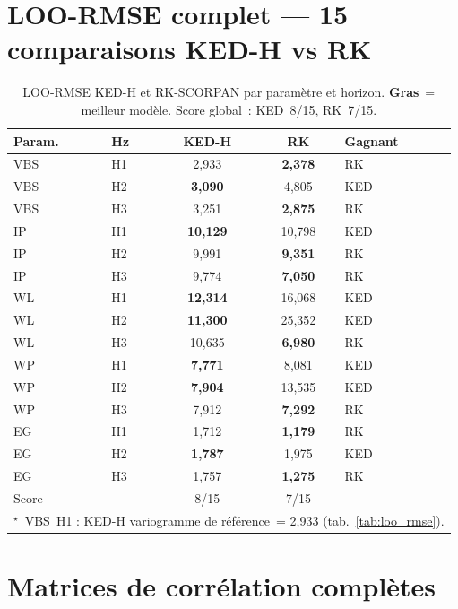 \documentclass[10pt,a4paper,twocolumn]{article}
\begin{document}
	\section{LOO-RMSE complet --- 15 comparaisons KED-H vs RK}
	\label{app:loo_complet}
	
	\begin{table}[H]
		\centering\small
		\caption{LOO-RMSE KED-H et RK-SCORPAN par paramètre et horizon.
			\textbf{Gras}~= meilleur modèle.
			Score global~: KED~8/15, RK~7/15.}
		\label{tab:loo_complet}
		\setlength{\tabcolsep}{4pt}
		\begin{tabular}{llccl}
			\toprule
			Param. & Hz & KED-H & RK & Gagnant \\
			\midrule
			VBS & H1 & 2,933          & \textbf{2,378} & RK  \\
			VBS & H2 & \textbf{3,090} & 4,805          & KED \\
			VBS & H3 & 3,251          & \textbf{2,875} & RK  \\
			IP  & H1 & \textbf{10,129}& 10,798         & KED \\
			IP  & H2 & 9,991          & \textbf{9,351} & RK  \\
			IP  & H3 & 9,774          & \textbf{7,050} & RK  \\
			WL  & H1 & \textbf{12,314}& 16,068         & KED \\
			WL  & H2 & \textbf{11,300}& 25,352         & KED \\
			WL  & H3 & 10,635         & \textbf{6,980} & RK  \\
			WP  & H1 & \textbf{7,771} & 8,081          & KED \\
			WP  & H2 & \textbf{7,904} & 13,535         & KED \\
			WP  & H3 & 7,912          & \textbf{7,292} & RK  \\
			EG  & H1 & 1,712          & \textbf{1,179} & RK  \\
			EG  & H2 & \textbf{1,787} & 1,975          & KED \\
			EG  & H3 & 1,757          & \textbf{1,275} & RK  \\
			\midrule
			\multicolumn{2}{l}{Score} & 8/15 & 7/15 & \\
			\bottomrule
			\multicolumn{5}{l}{\footnotesize $^\star$~VBS~H1 : KED-H
				variogramme de référence~= 2{,}933 (tab.~\ref{tab:loo_rmse}).}
		\end{tabular}
	\end{table}
	
	\section{Matrices de corrélation complètes}
	\label{app:correlations}
	
\end{document}
